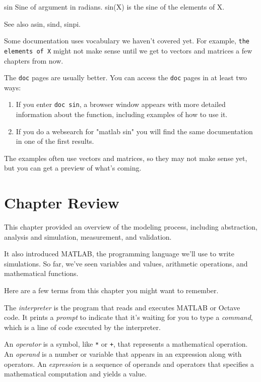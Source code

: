 \begin{stdout}
 sin    Sine of argument in radians.
    sin(X) is the sine of the elements of X.

    See also asin, sind, sinpi.
\end{stdout}

Some documentation uses vocabulary we haven't covered yet.
For example, \lstinline{the elements of X} might not make sense until
we get to vectors and matrices a few chapters from now.


The \lstinline{doc} pages are usually better.  You can access the \lstinline{doc} pages in at least two ways:

\begin{enumerate}
\item If you enter \lstinline{doc sin}, a browser window appears with more detailed information about the function, including examples of how to use it. 
\item If you do a websearch for "matlab sin" you will find the same documentation in one of the first results.
\end{enumerate}
The examples often use vectors and matrices, so they may not make sense yet,
but you can get a preview of what's coming.


\section{Chapter Review}

This chapter provided an overview of the modeling process, including abstraction, analysis and simulation, measurement, and validation.

It also introduced MATLAB, the programming language we'll use to write simulations.  So far, we've seen variables and values, arithmetic operations, and mathematical functions.

Here are a few terms from this chapter you might want to remember.

The \emph{interpreter} is the program that reads and executes MATLAB or \mbox{Octave} code.
It prints a \emph{prompt} to indicate that it's waiting for you to type a \emph{command}, which is a line of code executed by the interpreter.

An \emph{operator} is a symbol, like \lstinline{*} or \lstinline{+}, that
represents a mathematical operation.
An \emph{operand} is a number or variable that appears in an expression along
with operators.
An \emph{expression} is a sequence of operands and operators that specifies
a mathematical computation and yields a value.

